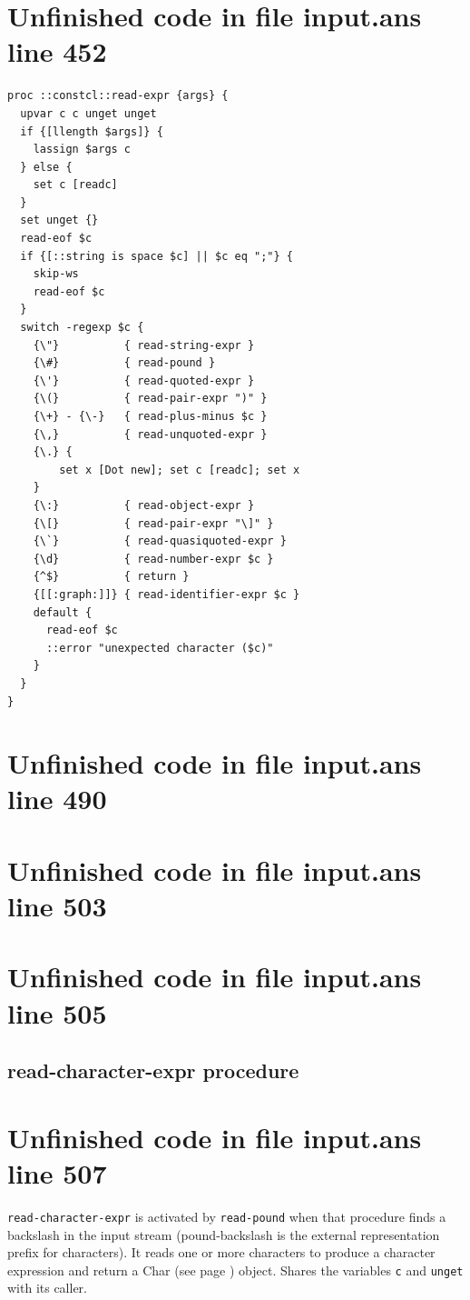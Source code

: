 \documentclass[twoside,9pt]{report}
\begin{document}
\section{Unfinished code in file input.ans line 452}
\begin{lstlisting}
proc ::constcl::read-expr {args} {
  upvar c c unget unget
  if {[llength $args]} {
    lassign $args c
  } else {
    set c [readc]
  }
  set unget {}
  read-eof $c
  if {[::string is space $c] || $c eq ";"} {
    skip-ws
    read-eof $c
  }
  switch -regexp $c {
    {\"}          { read-string-expr }
    {\#}          { read-pound }
    {\'}          { read-quoted-expr }
    {\(}          { read-pair-expr ")" }
    {\+} - {\-}   { read-plus-minus $c }
    {\,}          { read-unquoted-expr }
    {\.} {
        set x [Dot new]; set c [readc]; set x
    }
    {\:}          { read-object-expr }
    {\[}          { read-pair-expr "\]" }
    {\`}          { read-quasiquoted-expr }
    {\d}          { read-number-expr $c }
    {^$}          { return }
    {[[:graph:]]} { read-identifier-expr $c }
    default {
      read-eof $c
      ::error "unexpected character ($c)"
    }
  }
}
\end{lstlisting}
\section{Unfinished code in file input.ans line 490}
\section{Unfinished code in file input.ans line 503}
\section{Unfinished code in file input.ans line 505}
\subsection{read-character-expr procedure}
\label{read-character-expr-procedure}
\section{Unfinished code in file input.ans line 507}


\texttt{read-character-expr} is activated by \texttt{read-pound} when that procedure finds a backslash in the input stream (pound-backslash is the external representation prefix for characters). It reads one or more characters to produce a character expression and return a Char (see page \pageref{characters}) object. Shares the variables \texttt{c} and \texttt{unget} with its caller.
\end{document}
